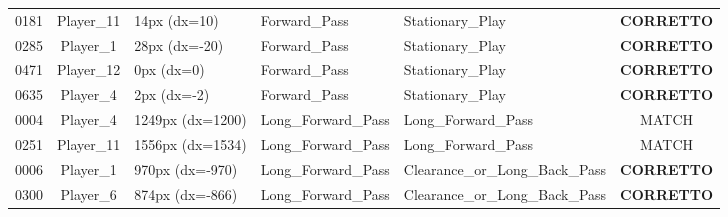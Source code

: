 \begin{table}[htbp]
\begin{tabular}{cclllc}
0181 & Player_11 & 14px (dx=10) & Forward\_Pass & Stationary\_Play & \textbf{CORRETTO} \\
0285 & Player_1 & 28px (dx=-20) & Forward\_Pass & Stationary\_Play & \textbf{CORRETTO} \\
0471 & Player_12 & 0px (dx=0) & Forward\_Pass & Stationary\_Play & \textbf{CORRETTO} \\
0635 & Player_4 & 2px (dx=-2) & Forward\_Pass & Stationary\_Play & \textbf{CORRETTO} \\
0004 & Player_4 & 1249px (dx=1200) & Long\_Forward\_Pass & Long\_Forward\_Pass & MATCH \\
0251 & Player_11 & 1556px (dx=1534) & Long\_Forward\_Pass & Long\_Forward\_Pass & MATCH \\
0006 & Player_1 & 970px (dx=-970) & Long\_Forward\_Pass & Clearance\_or\_Long\_Back\_Pass & \textbf{CORRETTO} \\
0300 & Player_6 & 874px (dx=-866) & Long\_Forward\_Pass & Clearance\_or\_Long\_Back\_Pass & \textbf{CORRETTO} \\
\hline
\end{tabular}
\end{table}